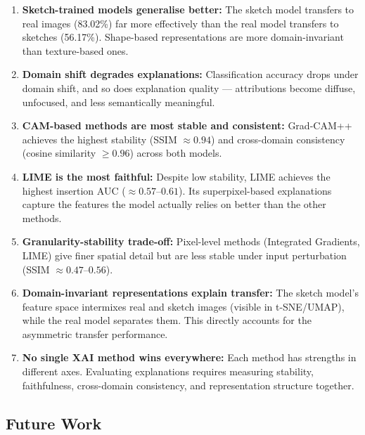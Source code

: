 \documentclass[12pt, a4paper]{article}
\begin{document}
\begin{enumerate}[leftmargin=*]
    \item \textbf{Sketch-trained models generalise better:}  The sketch model
          transfers to real images (83.02\%) far more effectively than the real
          model transfers to sketches (56.17\%).  Shape-based representations
          are more domain-invariant than texture-based ones.

    \item \textbf{Domain shift degrades explanations:}  Classification accuracy
          drops under domain shift, and so does explanation quality ---
          attributions become diffuse, unfocused, and less semantically
          meaningful.

    \item \textbf{CAM-based methods are most stable and consistent:}
          Grad-CAM++ achieves the highest stability (SSIM $\approx 0.94$) and
          cross-domain consistency (cosine similarity $\geq 0.96$) across both
          models.

    \item \textbf{LIME is the most faithful:}  Despite low stability, LIME
          achieves the highest insertion AUC ($\approx 0.57$--$0.61$).  Its
          superpixel-based explanations capture the features the model actually
          relies on better than the other methods.

    \item \textbf{Granularity-stability trade-off:}  Pixel-level methods
          (Integrated Gradients, LIME) give finer spatial detail but are less
          stable under input perturbation (SSIM $\approx 0.47$--$0.56$).

    \item \textbf{Domain-invariant representations explain transfer:}
          The sketch model's feature space intermixes real and sketch images
          (visible in t-SNE/UMAP), while the real model separates them.
          This directly accounts for the asymmetric transfer performance.

    \item \textbf{No single XAI method wins everywhere:}  Each method has
          strengths in different axes.  Evaluating explanations requires
          measuring stability, faithfulness, cross-domain consistency, and
          representation structure together.
\end{enumerate}

\subsection{Future Work}
\end{document}

